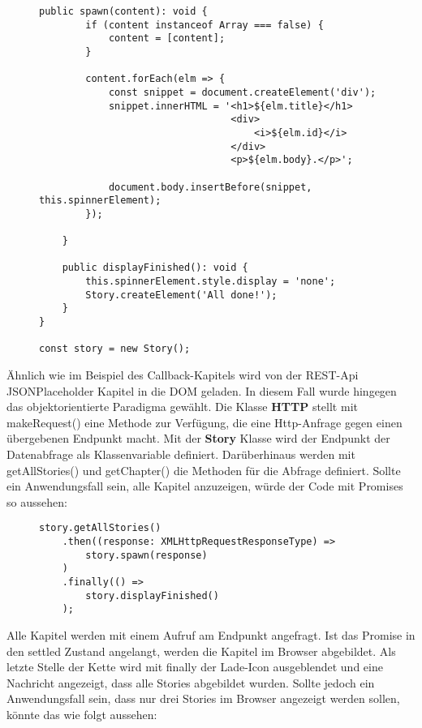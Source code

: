 \begin{figure}[H]
\begin{lstlisting}[basicstyle=\small]
    public spawn(content): void {
        if (content instanceof Array === false) {
            content = [content];
        }

        content.forEach(elm => {
            const snippet = document.createElement('div');
            snippet.innerHTML = '<h1>${elm.title}</h1>
                                 <div>
                                     <i>${elm.id}</i>
                                 </div>
                                 <p>${elm.body}.</p>';

            document.body.insertBefore(snippet, this.spinnerElement);
        });

    }

    public displayFinished(): void {
        this.spinnerElement.style.display = 'none';
        Story.createElement('All done!');
    }
}

const story = new Story();
\end{lstlisting}
\end{figure}

\noindent
Ähnlich wie im Beispiel des Callback-Kapitels wird von der REST-Api JSONPlaceholder Kapitel in die DOM geladen. In diesem Fall wurde hingegen das objektorientierte Paradigma gewählt. Die Klasse \textbf{HTTP} stellt mit makeRequest() eine Methode zur Verfügung, die eine Http-Anfrage gegen einen übergebenen Endpunkt macht. Mit der \textbf{Story} Klasse wird der Endpunkt der Datenabfrage als Klassenvariable definiert. Darüberhinaus werden mit getAllStories() und getChapter() die Methoden für die Abfrage definiert. Sollte ein Anwendungsfall sein, alle Kapitel anzuzeigen, würde der Code mit Promises so aussehen:

\begin{figure}[H]
\begin{lstlisting}[basicstyle=\small]
story.getAllStories()
    .then((response: XMLHttpRequestResponseType) =>
        story.spawn(response)
    )
    .finally(() =>
        story.displayFinished()
    );
\end{lstlisting}
\end{figure}

\noindent
Alle Kapitel werden mit einem Aufruf am Endpunkt angefragt. Ist das Promise in den settled Zustand angelangt, werden die Kapitel im Browser abgebildet. Als letzte Stelle der Kette wird mit finally der Lade-Icon ausgeblendet und eine Nachricht angezeigt, dass alle Stories abgebildet wurden. Sollte jedoch ein Anwendungsfall sein, dass nur drei Stories im Browser angezeigt werden sollen, könnte das wie folgt aussehen: 

